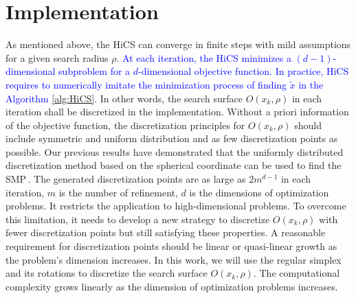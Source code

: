 \documentclass[mathpazo]{csam}
\theoremstyle{remark}
\begin{document}



\section{Implementation}
\label{sec:implement}

As mentioned above, the HiCS can converge in  
finite steps with mild assumptions for a given search radius $\rho$.
\textcolor{blue}{ 
At each iteration, the HiCS minimizes a
$(d-1)$-dimensional subproblem for a $d$-dimensional objective function.
In practice, HiCS requires to numerically imitate the minimization
process of finding $\tilde{x}$ in the Algorithm \ref{alg:HiCS}.
}
In other words, the search surface $O(x_k,\rho)$ in
each iteration shall be discretized in the implementation.
Without a priori information of the objective function,
the discretization principles for $O(x_k,\rho)$
should include symmetric and uniform distribution and as few discretization points as possible.
Our previous results have demonstrated that the uniformly distributed
discretization method based on the spherical coordinate
can be used to find the SMP\,\cite{huang2017hill}. 
The generated discretization points are as large as $2m^{d-1}$ in
each iteration, $m$ is the number of refinement, $d$ is the dimensions of
optimization problems. It restricts the
application to high-dimensional problems. 
To overcome this limitation, it needs to develop a new
strategy to discretize $O(x_k,\rho)$ with fewer discretization points
but still satisfying these properties.
A reasonable requirement for discretization points should be
linear or quasi-linear growth as the problem's dimension increases.
In this work, we will use the regular simplex and its rotations to
discretize the search surface $O(x_k,\rho)$. 
The computational complexity grows linearly as the
dimension of optimization problems increases.
\end{document}
